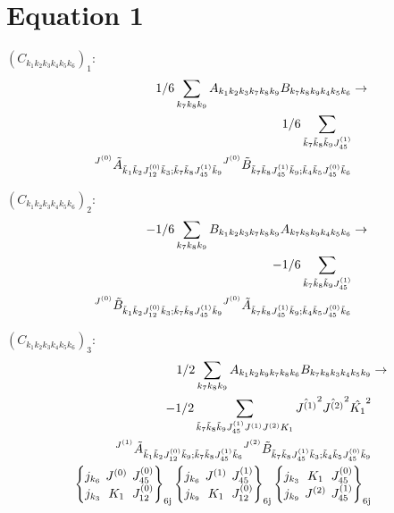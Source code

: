 \documentclass[11pt]{article}
\newcommand{\sixj}[6]{\begingroup\setlength{\arraycolsep}{0.2em}\begin{Bmatrix} #1 & #2 & #3 \\ #4 & #5 & #6 \end{Bmatrix}_{\text{6j}}\endgroup}
\begin{document}
\section{Equation 1}
$\left({C}_{{k}_{1}{k}_{2}{k}_{3}{k}_{4}{k}_{5}{k}_{6}}\right)_{1}$:
\begin{align}
1/6\sum_{{k}_{7}{k}_{8}{k}_{9}}{A}_{{k}_{1}{k}_{2}{k}_{3}{k}_{7}{k}_{8}{k}_{9}}{B}_{{k}_{7}{k}_{8}{k}_{9}{k}_{4}{k}_{5}{k}_{6}}&\rightarrow \notag \\1/6\sum_{\tilde{k}_{7}\tilde{k}_{8}\tilde{k}_{9}J^{(1)}_{45}}& \notag \\{}^{J^{(0)}}\tilde{A}_{\tilde{k}_{1}\tilde{k}_{2}J^{(0)}_{12}\tilde{k}_{3};\tilde{k}_{7}\tilde{k}_{8}J^{(1)}_{45}\tilde{k}_{9}}{}^{J^{(0)}}\tilde{B}_{\tilde{k}_{7}\tilde{k}_{8}J^{(1)}_{45}\tilde{k}_{9};\tilde{k}_{4}\tilde{k}_{5}J^{(0)}_{45}\tilde{k}_{6}}& \notag \\
\end{align}

$\left({C}_{{k}_{1}{k}_{2}{k}_{3}{k}_{4}{k}_{5}{k}_{6}}\right)_{2}$:
\begin{align}
-1/6\sum_{{k}_{7}{k}_{8}{k}_{9}}{B}_{{k}_{1}{k}_{2}{k}_{3}{k}_{7}{k}_{8}{k}_{9}}{A}_{{k}_{7}{k}_{8}{k}_{9}{k}_{4}{k}_{5}{k}_{6}}&\rightarrow \notag \\-1/6\sum_{\tilde{k}_{7}\tilde{k}_{8}\tilde{k}_{9}J^{(1)}_{45}}& \notag \\{}^{J^{(0)}}\tilde{B}_{\tilde{k}_{1}\tilde{k}_{2}J^{(0)}_{12}\tilde{k}_{3};\tilde{k}_{7}\tilde{k}_{8}J^{(1)}_{45}\tilde{k}_{9}}{}^{J^{(0)}}\tilde{A}_{\tilde{k}_{7}\tilde{k}_{8}J^{(1)}_{45}\tilde{k}_{9};\tilde{k}_{4}\tilde{k}_{5}J^{(0)}_{45}\tilde{k}_{6}}& \notag \\
\end{align}

$\left({C}_{{k}_{1}{k}_{2}{k}_{3}{k}_{4}{k}_{5}{k}_{6}}\right)_{3}$:
\begin{align}
1/2\sum_{{k}_{7}{k}_{8}{k}_{9}}{A}_{{k}_{1}{k}_{2}{k}_{9}{k}_{7}{k}_{8}{k}_{6}}{B}_{{k}_{7}{k}_{8}{k}_{3}{k}_{4}{k}_{5}{k}_{9}}&\rightarrow \notag \\-1/2\sum_{\tilde{k}_{7}\tilde{k}_{8}\tilde{k}_{9}J^{(1)}_{45}J^{(1)}J^{(2)}K_{1}}\hat{J^{(1)}}^{2}\hat{J^{(2)}}^{2}\hat{K_{1}}^{2}& \notag \\{}^{J^{(1)}}\tilde{A}_{\tilde{k}_{1}\tilde{k}_{2}J^{(0)}_{12}\tilde{k}_{9};\tilde{k}_{7}\tilde{k}_{8}J^{(1)}_{45}\tilde{k}_{6}}{}^{J^{(2)}}\tilde{B}_{\tilde{k}_{7}\tilde{k}_{8}J^{(1)}_{45}\tilde{k}_{3};\tilde{k}_{4}\tilde{k}_{5}J^{(0)}_{45}\tilde{k}_{9}}& \notag \\\sixj{j_{{k}_{6}}}{J^{(0)}}{J^{(0)}_{45}}{j_{{k}_{3}}}{K_{1}}{J^{(0)}_{12}}\sixj{j_{{k}_{6}}}{J^{(1)}}{J^{(1)}_{45}}{j_{{k}_{9}}}{K_{1}}{J^{(0)}_{12}}\sixj{j_{{k}_{3}}}{K_{1}}{J^{(0)}_{45}}{j_{{k}_{9}}}{J^{(2)}}{J^{(1)}_{45}}
\end{align}
\end{document}
